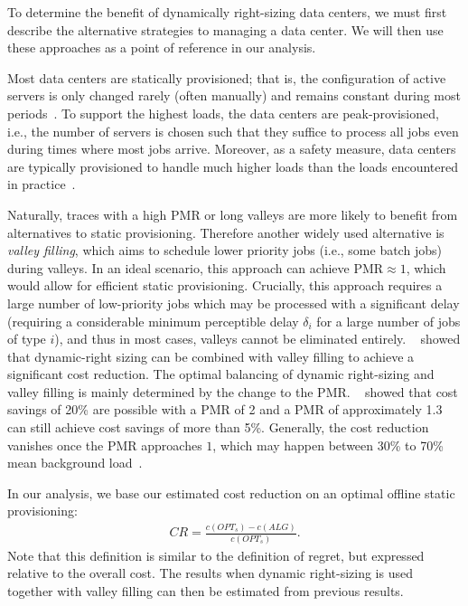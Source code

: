 To determine the benefit of dynamically right-sizing data centers, we must first describe the alternative strategies to managing a data center. We will then use these approaches as a point of reference in our analysis.

Most data centers are statically provisioned; that is, the configuration of active servers is only changed rarely (often manually) and remains constant during most periods~\cite{Whitney2014}. To support the highest loads, the data centers are peak-provisioned, i.e., the number of servers is chosen such that they suffice to process all jobs even during times where most jobs arrive. Moreover, as a safety measure, data centers are typically provisioned to handle much higher loads than the loads encountered in practice~\cite{Whitney2014}.

Naturally, traces with a high PMR or long valleys are more likely to benefit from alternatives to static provisioning. Therefore another widely used alternative is \emph{valley filling}, which aims to schedule lower priority jobs (i.e., some batch jobs) during valleys. In an ideal scenario, this approach can achieve $\text{PMR} \approx 1$, which would allow for efficient static provisioning. Crucially, this approach requires a large number of low-priority jobs which may be processed with a significant delay (requiring a considerable minimum perceptible delay $\delta_i$ for a large number of jobs of type $i$), and thus in most cases, valleys cannot be eliminated entirely. \citeauthor*{Lin2011}~\cite{Lin2011} showed that dynamic-right sizing can be combined with valley filling to achieve a significant cost reduction. The optimal balancing of dynamic right-sizing and valley filling is mainly determined by the change to the PMR. \citeauthor*{Lin2011}~\cite{Lin2011} showed that cost savings of 20\% are possible with a PMR of 2 and a PMR of approximately 1.3 can still achieve cost savings of more than 5\%. Generally, the cost reduction vanishes once the PMR approaches $1$, which may happen between 30\% to 70\% mean background load~\cite{Lin2011}.

In our analysis, we base our estimated cost reduction on an optimal offline static provisioning: \begin{align*}
    CR = \frac{c(OPT_s) - c(ALG)}{c(OPT_s)}.
\end{align*} Note that this definition is similar to the definition of regret, but expressed relative to the overall cost. The results when dynamic right-sizing is used together with valley filling can then be estimated from previous results.

